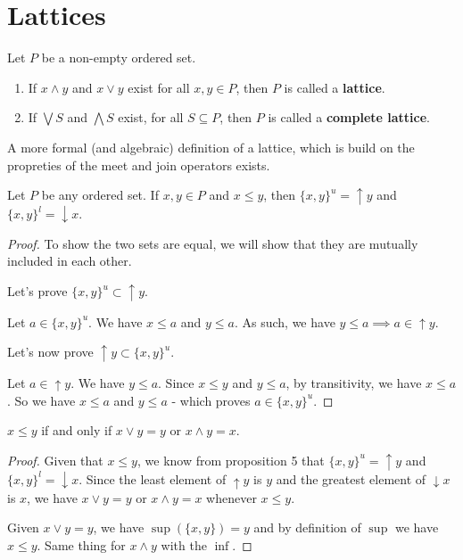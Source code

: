 \section{Lattices}

\begin{definition} Let $P$ be a non-empty ordered
set.

\begin{enumerate}
\item If $x \land y$ and $x \lor y$ exist for all $x,y \in P$, then $P$ is
called a \textbf{lattice}.
\item If $\bigvee S$ and $\bigwedge S$ exist, for all $S \subseteq P$, then $P$
is called a \textbf{complete lattice}.
\end{enumerate}
\end{definition}

\begin{remark} A more formal (and algebraic) definition of a lattice, which is
build on the propreties of the meet and join operators exists.
\end{remark}

\begin{prop} Let $P$ be any ordered set. If $x,y \in P$ and $x \leq y$, then
$\{x,y\}^u = \uparrow y$ and $\{x,y\}^l = \downarrow x$.
\end{prop}

\begin{proof} To show the two sets are equal, we will show that they are
mutually included in each other.

Let's prove $\{x,y\}^u \subset \uparrow y$.

Let $a \in \{x,y\}^u$. We have $x \leq a$ and $y \leq a$. As such, we have $y
\leq a \implies a \in \uparrow y$.

Let's now prove $\uparrow y \subset \{x,y\}^u$.

Let $a \in \uparrow y$. We have $y \leq a$. Since $x \leq y$ and $y \leq a$, by
transitivity, we have $x \leq a$. So we have $x \leq a$ and $y \leq a$ - which
proves $a \in \{x,y\}^u$.
\end{proof}

\begin{prop} $x \leq y$ if and only if $x \lor y = y$ or $x \land y = x$.
\end{prop}

\begin{proof} Given that $x \leq y$, we know from proposition 5 that $\{x,y\}^u
= \uparrow y$ and $\{x,y\}^l = \downarrow x$. Since the least element of
$\uparrow y$ is $y$ and the greatest element of $\downarrow x$ is $x$, we have
$x \lor y = y$ or $x \land y = x$ whenever $x \leq y$.

Given $x \lor y = y$, we have $\sup(\{x,y\}) = y$ and by definition of $\sup$ we
have $x \leq y$. Same thing for $x \land y$ with the $\inf$.
\end{proof}

